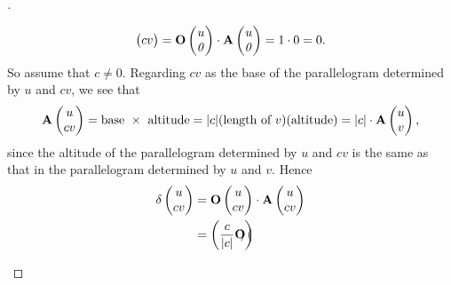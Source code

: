 \begin{proof}[]
\begin{enumerate}
\[\begin{pmatrix}
              cv
            \end{pmatrix} = \mathbf{O}\begin{pmatrix}
              u \\
              \mathit{0}
            \end{pmatrix} \cdot \mathbf{A}\begin{pmatrix}
              u \\
              \mathit{0}
            \end{pmatrix} = 1 \cdot 0 = 0.
          \]
          So assume that \(c \neq 0\).
          Regarding \(cv\) as the base of the parallelogram determined by \(u\) and \(cv\), we see that
          \[
            \mathbf{A}\begin{pmatrix}
              u \\
              cv
            \end{pmatrix} = \text{base } \times \text{ altitude} = \abs{c} (\text{length of } v) (\text{altitude}) = \abs{c} \cdot \mathbf{A}\begin{pmatrix}
              u \\
              v
            \end{pmatrix},
          \]
          since the altitude of the parallelogram determined by \(u\) and \(cv\) is the same as that in the parallelogram determined by \(u\) and \(v\).
          Hence
          \begin{align*}
            \delta\begin{pmatrix}
                    u \\
                    cv
                  \end{pmatrix} & = \mathbf{O}\begin{pmatrix}
                                                u \\
                                                cv
                                              \end{pmatrix} \cdot \mathbf{A}\begin{pmatrix}
                                                                              u \\
                                                                              cv
                                                                            \end{pmatrix}                                              \\
                                  & = \left\lparen\frac{c}{\left\lvert c\right\rvert} \mathbf{O}\begin{pmatrix}

\end{pmatrix}\right\rparen
\end{align*}
\end{enumerate}
\end{proof}
